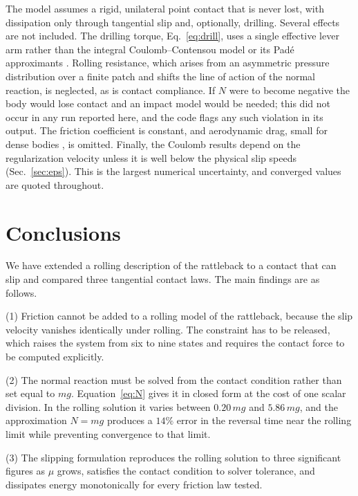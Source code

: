 \documentclass[aps,pre,twocolumn,superscriptaddress,amsmath,amssymb,floatfix,nofootinbib]{revtex4-2}
\begin{document}
The model assumes a rigid, unilateral point contact that is never lost, with dissipation
only through tangential slip and, optionally, drilling. Several effects are not
included. The drilling torque, Eq.~\eqref{eq:drill}, uses a single effective lever arm
rather than the integral Coulomb--Contensou model or its Pad\'e approximants
\cite{Contensou1963,Zhuravlev1998,Kudra2015}. Rolling resistance, which arises from an
asymmetric pressure distribution over a finite patch and shifts the line of action of the
normal reaction, is neglected, as is contact compliance. If $N$ were to become negative
the body would lose contact and an impact model would be needed; this did not occur in
any run reported here, and the code flags any such violation in its output. The
friction coefficient is constant, and aerodynamic drag, small for dense bodies
\cite{Garcia1988}, is omitted. Finally, the Coulomb results depend on the regularization
velocity unless it is well below the physical slip speeds (Sec.~\ref{sec:eps}). This is
the largest numerical uncertainty, and converged values are quoted throughout.

\section{Conclusions}\label{sec:conclusions}

We have extended a rolling description of the rattleback to a contact that can slip and
compared three tangential contact laws. The main findings are as follows.

(1) Friction cannot be added to a rolling model of the rattleback, because the slip
velocity vanishes identically under rolling. The constraint has to be released, which
raises the system from six to nine states and requires the contact force to be computed
explicitly.

(2) The normal reaction must be solved from the contact condition rather than set equal
to $mg$. Equation~\eqref{eq:N} gives it in closed form at the cost of one scalar
division. In the rolling solution it varies between $0.20\,mg$ and $5.86\,mg$, and the
approximation $N=mg$ produces a $14\%$ error in the reversal time near the rolling limit
while preventing convergence to that limit.

(3) The slipping formulation reproduces the rolling solution to three significant
figures as $\mu$ grows, satisfies the contact condition to solver tolerance, and
dissipates energy monotonically for every friction law tested.
\end{document}
